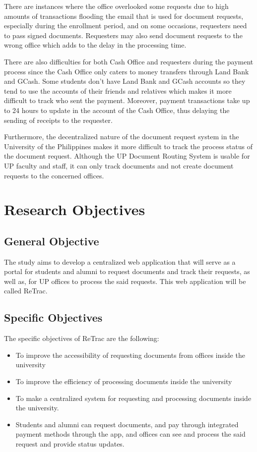 There are instances where the office overlooked some requests due to high amounts of transactions flooding the email that is used for document requests, especially during the enrollment period, and on some occasions, requesters need to pass signed documents. Requesters may also send document requests to the wrong office which adds to the delay in the processing time.

There are also difficulties for both Cash Office and requesters during the payment process since the Cash Office only caters to money transfers through Land Bank and GCash. Some students don't have Land Bank and GCash accounts so they tend to use the accounts of their friends and relatives which makes it more difficult to track who sent the payment. Moreover, payment transactions take up to 24 hours to update in the account of the Cash Office, thus delaying the sending of receipts to the requester.

Furthermore, the decentralized nature of the document request system in the University of the Philippines makes it more difficult to track the process status of the document request. Although the UP Document Routing System is usable for UP faculty and staff, it can only track documents and not create document requests to the concerned offices.


\section{Research Objectives}
\label{sec:researchobjectives}

\subsection{General Objective}
\label{sec:generalobjective}

The study aims to develop a centralized web application that will serve as a portal for students and alumni to request documents and track their requests, as well as, for UP offices to process the said requests. This web application will be called ReTrac.


\subsection{Specific Objectives}
\label{sec:specificobjectives}


The specific objectives of ReTrac are the following:
\begin{itemize}
    \item To improve the accessibility of requesting documents from offices inside the university
    \item To improve the efficiency of processing documents inside the university
    \item To make a centralized system for requesting and processing documents inside the university.
    \item Students and alumni can request documents, and pay through integrated payment methods through the app, and offices can see and process the said request and provide status updates.
    \vfill
\end{itemize}


